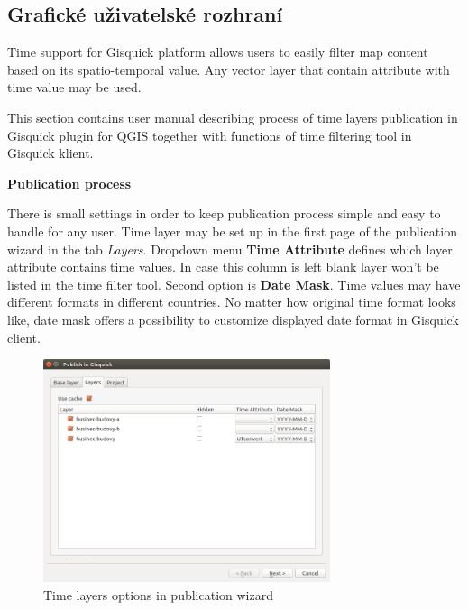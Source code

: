 \newpage
\subsection{Grafické uživatelské rozhraní}
\label{sssec:manual-gui}

Time support for Gisquick platform allows users to easily filter 
map content based on its spatio-temporal value. Any vector layer that 
contain attribute with time value may be used. 

This section contains user manual describing process of time layers 
publication in Gisquick plugin for QGIS together with functions of time
filtering tool in Gisquick klient.  

\bigskip
\noindent \textbf{Publication process}

There is small settings in order to keep publication process simple
and easy to handle for any user. Time layer may be set up in the first
page of the publication wizard in the tab \textit{Layers}.  Dropdown
menu \textbf{Time Attribute} defines which layer attribute contains
time values. In case this column is left blank layer won't be listed
in the time filter tool. Second option is \textbf{Date Mask}. Time
values may have different formats in different countries. No matter
how original time format looks like, date mask offers a possibility to
customize displayed date format in Gisquick client.

\begin{figure}[h!]
	\centering
	\includegraphics[width=0.75\textwidth]{../img/plugin-layers.png}
	\caption{Time layers options in publication wizard}
	\label{fig:publication-wizard-layers}
\end{figure}

